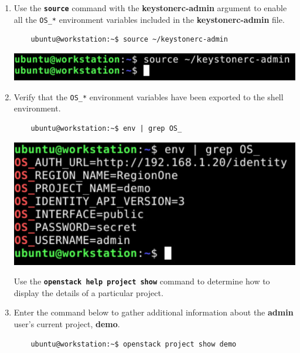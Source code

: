\documentclass[letterpaper, 12pt]{article}
\begin{document}
\begin{enumerate}
    \item Use the \textbf{\texttt{source}} command with the \textbf{keystonerc-admin} argument to enable all the
    \texttt{OS\_*} environment variables included in the \textbf{keystonerc-admin} file.
    \begin{lstlisting}
    ubuntu@workstation:~$ source ~/keystonerc-admin
    \end{lstlisting}

    \begin{center}
        \includegraphics[width=\linewidth]{images/part2/step3.png}
    \end{center}

    \item Verify that the \texttt{OS\_*} environment variables have been exported to the shell environment.
    \begin{lstlisting}
    ubuntu@workstation:~$ env | grep OS_
    \end{lstlisting}

    \begin{center}
        \includegraphics[width=\linewidth]{images/part2/step4.png}
    \end{center}

    \begin{tipbox}
        Use the \textbf{\texttt{openstack help project show}} command to determine how to display the details of a
        particular project.
    \end{tipbox}

    \item Enter the command below to gather additional information about the \textbf{admin} user's current project,
    \textbf{demo}.
    \begin{lstlisting}
    ubuntu@workstation:~$ openstack project show demo
    \end{lstlisting}


\end{enumerate}
\end{document}
